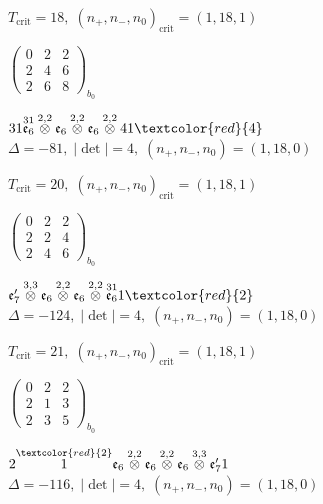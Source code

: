 \documentclass[10pt]{article}
\begin{document}
\hspace{1em}$T_{\text{crit}}=18,\; (n_+,n_-,n_0)_{\text{crit}}=(1,18,1)$

\hspace{2em}$\left(\begin{smallmatrix}0 & 2 & 2 \\ 2 & 4 & 6 \\ 2 & 6 & 8\end{smallmatrix}\right)_{\!b_0}$

$31\overset{31}{\mathfrak{e}_6}\overset{2,2}{\otimes}\mathfrak{e}_6\overset{2,2}{\otimes}\mathfrak{e}_6\overset{2,2}{\otimes}41\textcolor{red}{4}$ \quad $\Delta=-81,\; |\det|=4,\; (n_+,n_-,n_0)=(1,18,0)$

\hspace{1em}$T_{\text{crit}}=20,\; (n_+,n_-,n_0)_{\text{crit}}=(1,18,1)$

\hspace{2em}$\left(\begin{smallmatrix}0 & 2 & 2 \\ 2 & 2 & 4 \\ 2 & 4 & 6\end{smallmatrix}\right)_{\!b_0}$

\smallskip

$\mathfrak{e}_7'\overset{3,3}{\otimes}\mathfrak{e}_6\overset{2,2}{\otimes}\mathfrak{e}_6\overset{2,2}{\otimes}\overset{31}{\mathfrak{e}_6}1\textcolor{red}{2}$ \quad $\Delta=-124,\; |\det|=4,\; (n_+,n_-,n_0)=(1,18,0)$

\hspace{1em}$T_{\text{crit}}=21,\; (n_+,n_-,n_0)_{\text{crit}}=(1,18,1)$

\hspace{2em}$\left(\begin{smallmatrix}0 & 2 & 2 \\ 2 & 1 & 3 \\ 2 & 3 & 5\end{smallmatrix}\right)_{\!b_0}$

\smallskip

$2\overset{\textcolor{red}{2}}{1}\mathfrak{e}_6\overset{2,2}{\otimes}\mathfrak{e}_6\overset{2,2}{\otimes}\mathfrak{e}_6\overset{3,3}{\otimes}\mathfrak{e}_7'1$ \quad $\Delta=-116,\; |\det|=4,\; (n_+,n_-,n_0)=(1,18,0)$
\end{document}
